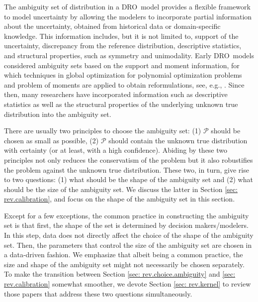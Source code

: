\documentclass[final,onefignum,onetabnum]{class}
\newcommand{\Cs}[1]{\mathcal{#1}} %
\newcommand{\dro}{DRO}
\begin{document}
The ambiguity set of distribution in a \dro\ model provides a  flexible framework to model uncertainty  by allowing the modelers to incorporate partial information about the uncertainty, obtained from historical data or domain-specific knowledge. This information includes, but it is not limited to, support of the uncertainty, discrepancy from the reference distribution, descriptive statistics, and structural properties, such as symmetry and unimodality. 
Early \dro\ models  considered ambiguity sets based on the support and moment information, for
which techniques in global optimization for polynomial optimization problems and problem of moments are
applied to obtain reformulations, see, e.g., \citet{lasserre2001,bertsimas2006persistence,bertsimas2005optimal,popescu2005semidefinite,popescu2007,gilboa1989}. 
Since then, many researchers have incorporated information such as  descriptive statistics as well as the structural properties  of the underlying unknown true distribution into the ambiguity set. 

There are usually two  principles  to choose the ambiguity set: (1) $\Cs{P}$ should be chosen as small as possible, (2) $\Cs{P}$ should contain the unknown true distribution with certainty (or at least, with a high confidence). Abiding by these two principles not only reduces the conservatism of the problem but it also  robustifies the problem against the unknown true distribution. 
These two, in turn, give rise to two questions: (1) what should be  the shape of the ambiguity set and (2) what should be the size of the ambiguity set. 
We discuss the latter in Section  \ref{sec: rev.calibration}, and focus on the shape of the ambiguity set in this section. 

Except for a few exceptions, the common practice in constructing the ambiguity set is that first, the shape of the  set is determined by decision makers/modelers. In this step, data does not directly affect the choice of the shape of the ambiguity set. Then, the parameters that control the size of the ambiguity set are chosen in a data-driven fashion. We emphasize that albeit being a common practice,  the size and shape of the ambiguity set might not  necessarily be chosen separately. To make the transition between Section \ref{sec: rev.choice.ambiguity} and \ref{sec: rev.calibration} somewhat smoother, we devote Section \ref{sec: rev.kernel} to  review those papers that address these two questions simultaneously.   
 
\end{document}
